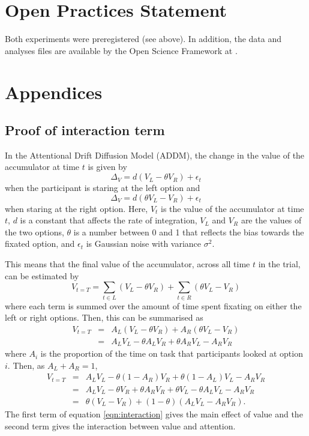 \documentclass[doc, a4paper, apacite]{apa6}
\begin{document}
\section{Open Practices Statement}
Both experiments were preregistered (see above). In addition, the data and analyses files are available by the Open Science Framework at \url{}. 

\clearpage
\newpage



\clearpage
\newpage
\section{Appendices}
\subsection{Proof of interaction term}
In the Attentional Drift Diffusion Model (ADDM), the change in the value of the accumulator at time $t$ is given by 
\begin{equation}
	\Delta_V = d(V_L - \theta V_R) + \epsilon_t
\end{equation}
when the participant is staring at the left option and
\begin{equation}
	\Delta_V = d(\theta V_L - V_R) + \epsilon_t
\end{equation}
when staring at the right option. Here, $V_t$ is the value of the accumulator at time $t$, $d$ is a constant that affects the rate of integration, $V_L$ and $V_R$ are the values of the two options, $\theta$ is a number between 0 and 1 that reflects the bias towards the fixated option, and $\epsilon_t$ is Gaussian noise with variance $\sigma^2$. 

 This means that the final value of the accumulator, across all time $t$ in the trial, can be estimated by 
 \begin{equation}
 	V_{t=T} = \sum_{t \in L} \left(V_L - \theta V_R\right) + \sum_{t \in R}	\left(\theta V_L - V_R\right) 
 \end{equation}
 where each term is summed over the amount of time spent fixating on either the left or right options. Then, this can be summarised as 
 \begin{eqnarray}	
 	V_{t=T}&=& A_L\left(V_L -\theta V_R\right) + A_R \left(\theta V_L - V_R \right)\\
 	&=& A_L V_L - \theta A_L V_R + \theta A_R V_L - A_R V_R
 \end{eqnarray}
 where $A_i$ is the proportion of the time on task that participants looked at option $i$. Then, as $A_L + A_R = 1$, 
 \begin{eqnarray}
 	V_{t=T} &=& A_L V_L -\theta(1-A_R)V_R + \theta(1-A_L) V_L - A_R V_R \\
 		  &=& A_L V_L -\theta V_R + \theta A_R V_R + \theta V_L - \theta A_L V_L - A_R V_R \\
 		  &=& \theta(V_L - V_R) + (1-\theta)(A_L V_L - A_R V_R). \label{eqn:interaction}
 \end{eqnarray}
 The first term of equation \ref{eqn:interaction} gives the main effect of value and the second term gives the interaction between value and attention. 
 
\end{document}
